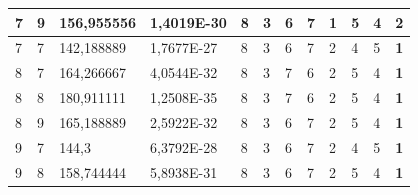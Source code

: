 \documentclass[conference]{IEEEtran}
\begin{document}
\begin{table}[]
\begin{tabular}{|llll|llllllll|}
		\multicolumn{1}{|l|}{7}   & \multicolumn{1}{l|}{9}         & \multicolumn{1}{l|}{156,955556}    & 1,4019E-30 & \multicolumn{1}{l|}{8}   & \multicolumn{1}{l|}{3}   & \multicolumn{1}{l|}{6}   & \multicolumn{1}{l|}{7}   & \multicolumn{1}{l|}{\textbf{1}} & \multicolumn{1}{l|}{5}   & \multicolumn{1}{l|}{4}   & 2                      \\ \hline
		\multicolumn{1}{|l|}{7}   & \multicolumn{1}{l|}{7}         & \multicolumn{1}{l|}{142,188889}    & 1,7677E-27 & \multicolumn{1}{l|}{8}   & \multicolumn{1}{l|}{3}   & \multicolumn{1}{l|}{6}   & \multicolumn{1}{l|}{7}   & \multicolumn{1}{l|}{2}          & \multicolumn{1}{l|}{4}   & \multicolumn{1}{l|}{5}   & \textbf{1}             \\ \hline
		\multicolumn{1}{|l|}{8}   & \multicolumn{1}{l|}{7}         & \multicolumn{1}{l|}{164,266667}    & 4,0544E-32 & \multicolumn{1}{l|}{8}   & \multicolumn{1}{l|}{3}   & \multicolumn{1}{l|}{7}   & \multicolumn{1}{l|}{6}   & \multicolumn{1}{l|}{2}          & \multicolumn{1}{l|}{5}   & \multicolumn{1}{l|}{4}   & \textbf{1}             \\ \hline
		\multicolumn{1}{|l|}{8}   & \multicolumn{1}{l|}{8}         & \multicolumn{1}{l|}{180,911111}    & 1,2508E-35 & \multicolumn{1}{l|}{8}   & \multicolumn{1}{l|}{3}   & \multicolumn{1}{l|}{7}   & \multicolumn{1}{l|}{6}   & \multicolumn{1}{l|}{2}          & \multicolumn{1}{l|}{5}   & \multicolumn{1}{l|}{4}   & \textbf{1}             \\ \hline
		\multicolumn{1}{|l|}{8}   & \multicolumn{1}{l|}{9}         & \multicolumn{1}{l|}{165,188889}    & 2,5922E-32 & \multicolumn{1}{l|}{8}   & \multicolumn{1}{l|}{3}   & \multicolumn{1}{l|}{6}   & \multicolumn{1}{l|}{7}   & \multicolumn{1}{l|}{2}          & \multicolumn{1}{l|}{5}   & \multicolumn{1}{l|}{4}   & \textbf{1}             \\ \hline
		\multicolumn{1}{|l|}{9}   & \multicolumn{1}{l|}{7}         & \multicolumn{1}{l|}{144,3}         & 6,3792E-28 & \multicolumn{1}{l|}{8}   & \multicolumn{1}{l|}{3}   & \multicolumn{1}{l|}{6}   & \multicolumn{1}{l|}{7}   & \multicolumn{1}{l|}{2}          & \multicolumn{1}{l|}{4}   & \multicolumn{1}{l|}{5}   & \textbf{1}             \\ \hline
		\multicolumn{1}{|l|}{9}   & \multicolumn{1}{l|}{8}         & \multicolumn{1}{l|}{158,744444}    & 5,8938E-31 & \multicolumn{1}{l|}{8}   & \multicolumn{1}{l|}{3}   & \multicolumn{1}{l|}{6}   & \multicolumn{1}{l|}{7}   & \multicolumn{1}{l|}{2}          & \multicolumn{1}{l|}{5}   & \multicolumn{1}{l|}{4}   & \textbf{1}             \\ \hline

\end{tabular}
\end{table}
\end{document}
